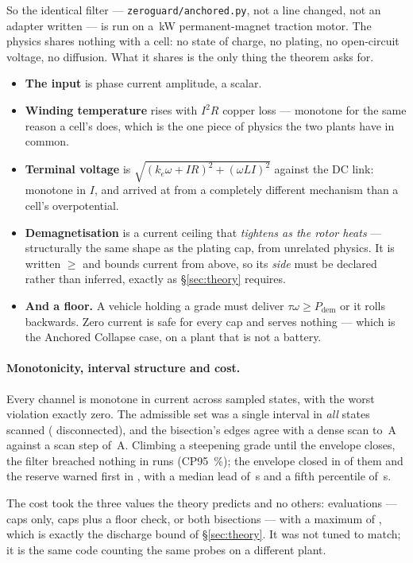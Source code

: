 \documentclass[11pt,letterpaper]{article}
\theoremstyle{definition}
\theoremstyle{remark}
\begin{document}
So the identical filter --- \texttt{zeroguard/anchored.py}, not a line changed, not an adapter
written --- is run on a \mtPower\,kW permanent-magnet traction motor. The physics shares nothing
with a cell: no state of charge, no plating, no open-circuit voltage, no diffusion. What it
shares is the only thing the theorem asks for.

\begin{itemize}\itemsep1pt
\item \textbf{The input} is phase current amplitude, a scalar.
\item \textbf{Winding temperature} rises with $I^2R$ copper loss --- monotone for the same
reason a cell's does, which is the one piece of physics the two plants have in common.
\item \textbf{Terminal voltage} is $\sqrt{(k_e\omega + IR)^2 + (\omega L I)^2}$ against the DC
link: monotone in $I$, and arrived at from a completely different mechanism than a cell's
overpotential.
\item \textbf{Demagnetisation} is a current ceiling that \emph{tightens as the rotor heats} ---
structurally the same shape as the plating cap, from unrelated physics. It is written $\ge$ and
bounds current from above, so its \emph{side} must be declared rather than inferred, exactly as
\S\ref{sec:theory} requires.
\item \textbf{And a floor.} A vehicle holding a grade must deliver $\tau\omega \ge P_{\mathrm{dem}}$
or it rolls backwards. Zero current is safe for every cap and serves nothing --- which is the
Anchored Collapse case, on a plant that is not a battery.
\end{itemize}

\paragraph{Monotonicity, interval structure and cost.} Every channel is monotone in current
across \mtStates{} sampled states, with the worst violation exactly zero. The admissible set was
a single interval in \emph{all} \mtScan{} states scanned (\mtDisc{} disconnected), and the
bisection's edges agree with a dense scan to \mtDev\,A against a scan step of \mtStep\,A.
Climbing a steepening grade until the envelope closes, the filter breached nothing in
\mtRuns{} runs (CP95 \mtCP\,\%); the envelope closed in \mtClosed{} of them and the reserve
warned first in \mtWarned, with a median lead of \mtLead\,s and a fifth percentile of
\mtLeadP\,s.

The cost took the three values the theory predicts and no others: \mtPaths{} evaluations ---
caps only, caps plus a floor check, or both bisections --- with a maximum of \mtEvalsMax, which
is exactly the discharge bound of \S\ref{sec:theory}. It was not tuned to match; it is the same
code counting the same probes on a different plant.
\end{document}
